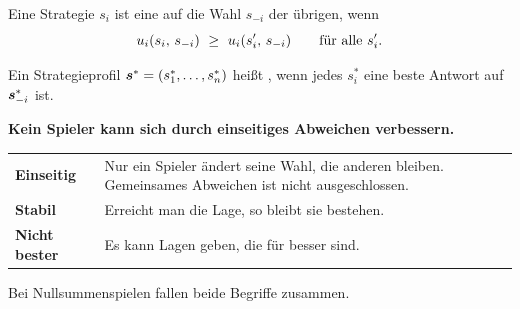 \begin{definition}
Eine Strategie $s_i$ ist eine  auf die Wahl $s_{-i}$ der übrigen, wenn
\[ \Aus_i(s_i,\,s_{-i}) \ \ge\ \Aus_i(s_i',\,s_{-i}) \qquad\text{für alle } s_i' . \]
\end{definition}

\begin{definition}
Ein Strategieprofil $\boldsymbol{s}^{*} = (s_1^{*},\ldots,s_n^{*})$ heißt , wenn jedes $s_i^{*}$ eine beste Antwort auf $\boldsymbol{s}_{-i}^{*}$ ist.
\end{definition}

\begin{merksatz}
\begin{center}
\begin{minipage}{0.9\textwidth}
\textbf{Kein Spieler kann sich durch einseitiges Abweichen verbessern.}
\end{minipage}
\end{center}

\begin{center}
{\small
\renewcommand{\arraystretch}{1.52}
\begin{tabular}{@{}P{2.4cm}P{6.2cm}@{}}
\toprule
\textbf{Einseitig} & Nur ein Spieler ändert seine Wahl, die anderen bleiben. Gemeinsames Abweichen ist nicht ausgeschlossen.\\
\textbf{Stabil} & Erreicht man die Lage, so bleibt sie bestehen.\\
\textbf{Nicht bester} & Es kann Lagen geben, die für  besser sind.\\
\bottomrule
\end{tabular}}
\end{center}

\begin{center}
\begin{minipage}{0.88\textwidth}
\end{minipage}
\end{center}

Bei Nullsummenspielen fallen beide Begriffe zusammen.

\begin{center}
\begin{minipage}{0.88\textwidth}
\end{minipage}
\end{center}
\end{merksatz}

